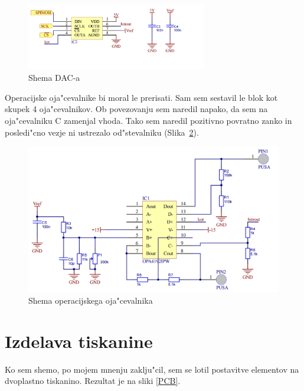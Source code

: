 \documentclass[a4paper]{article}
\begin{document}
	\begin{figure}[!h]
		\centering
		\includegraphics[width=0.7\textwidth]{DAC.png}
		\caption{Shema DAC-a}
		\label{DACshema}
	\end{figure}



Operacijske oja"cevalnike bi moral le prerisati. Sam sem sestavil le blok kot skupek 4 oja"cevalnikov. Ob povezovanju sem naredil napako, da sem na  oja"cevalniku C zamenjal vhoda. Tako sem naredil pozitivno povratno zanko in posledi"cno vezje ni ustrezalo od"stevalniku (Slika~\ref{OPshema}).


	\begin{figure}[!h]
		\centering
		\includegraphics[width=\textwidth]{OP.png}
		\caption{Shema operacijskega oja"cevalnika}
		\label{OPshema}
	\end{figure}


\section{Izdelava tiskanine}

Ko sem shemo, po mojem mnenju zaklju"cil, sem se lotil postavitve elementov na dvoplastno tiskanino. Rezultat je na sliki \ref{PCB}.
\end{document}
